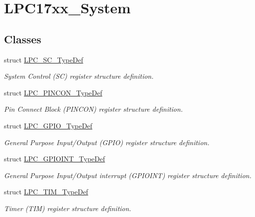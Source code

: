 \hypertarget{group___l_p_c17xx___system}{\section{\-L\-P\-C17xx\-\_\-\-System}
\label{group___l_p_c17xx___system}
}
\subsection*{\-Classes}
\begin{DoxyCompactItemize}
\item 
struct \hyperlink{struct_l_p_c___s_c___type_def}{\-L\-P\-C\-\_\-\-S\-C\-\_\-\-Type\-Def}
\begin{DoxyCompactList}\small\item\em \-System \-Control (\-S\-C) register structure definition. \end{DoxyCompactList}\item 
struct \hyperlink{struct_l_p_c___p_i_n_c_o_n___type_def}{\-L\-P\-C\-\_\-\-P\-I\-N\-C\-O\-N\-\_\-\-Type\-Def}
\begin{DoxyCompactList}\small\item\em \-Pin \-Connect \-Block (\-P\-I\-N\-C\-O\-N) register structure definition. \end{DoxyCompactList}\item 
struct \hyperlink{struct_l_p_c___g_p_i_o___type_def}{\-L\-P\-C\-\_\-\-G\-P\-I\-O\-\_\-\-Type\-Def}
\begin{DoxyCompactList}\small\item\em \-General \-Purpose \-Input/\-Output (\-G\-P\-I\-O) register structure definition. \end{DoxyCompactList}\item 
struct \hyperlink{struct_l_p_c___g_p_i_o_i_n_t___type_def}{\-L\-P\-C\-\_\-\-G\-P\-I\-O\-I\-N\-T\-\_\-\-Type\-Def}
\begin{DoxyCompactList}\small\item\em \-General \-Purpose \-Input/\-Output interrupt (\-G\-P\-I\-O\-I\-N\-T) register structure definition. \end{DoxyCompactList}\item 
struct \hyperlink{struct_l_p_c___t_i_m___type_def}{\-L\-P\-C\-\_\-\-T\-I\-M\-\_\-\-Type\-Def}
\begin{DoxyCompactList}\small\item\em \-Timer (\-T\-I\-M) register structure definition. \end{DoxyCompactList}\item 

\end{DoxyCompactItemize}
